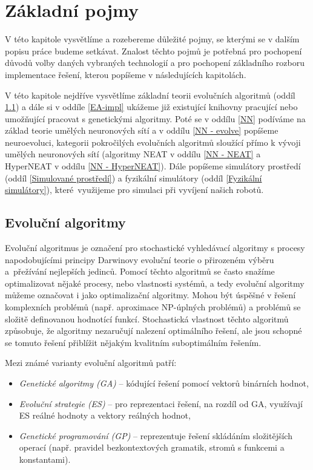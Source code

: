 \chapter{Základní pojmy} \label{chapter-zakladní pojmy}

V této kapitole vysvětlíme a rozebereme důležité pojmy, se kterými se v dalším
popisu práce budeme setkávat. Znalost těchto pojmů je potřebná pro pochopení
důvodů volby daných vybraných technologií a pro pochopení základního rozboru
implementace řešení, kterou popíšeme v následujících kapitolách.

V této kapitole nejdříve vysvětlíme základní teorii evolučních algoritmů (oddíl
\ref{Evoluční algoritmy}) a dále si v oddíle \ref{EA-impl} ukážeme již
existující knihovny pracující nebo umožňující pracovat s genetickými algoritmy.
Poté se v oddílu \ref{NN} podíváme na základ teorie umělých neuronových sítí a
v oddílu \ref{NN - evolve} popíšeme neuroevoluci, kategorii pokročilých
evolučních algoritmů sloužící přímo k vývoji umělých neuronových sítí
(algoritmy NEAT v oddílu \ref{NN - NEAT} a HyperNEAT v oddílu \ref{NN -
HyperNEAT}). Dále popíšeme simulátory prostředí (oddíl \ref{Simulované
prostředí}) a fyzikální simulátory (oddíl \ref{Fyzikální simulátory}),
které~využijeme pro simulaci při vyvíjení našich robotů.

\section{Evoluční algoritmy} \label{Evoluční algoritmy}

Evoluční algoritmus je označení pro stochastické vyhledávací algoritmy s
procesy napodobujícími principy Darwinovy evoluční teorie o přirozeném výběru
a~přežívání nejlepších jedinců. Pomocí těchto algoritmů se často snažíme
optimalizovat nějaké procesy, nebo vlastnosti systémů, a tedy evoluční
algoritmy můžeme označovat i jako optimalizační algoritmy. Mohou být úspěšné v
řešení komplexních problémů (např. aproximace NP-úplných problémů) a problémů
se složitě definovanou hodnotící funkcí. Stochastická vlastnost těchto
algoritmů způsobuje, že algoritmy nezaručují nalezení optimálního řešení, ale
jsou schopné se tomuto řešení přiblížit nějakým kvalitním suboptimálním
řešením.

Mezi známé varianty evoluční algoritmů patří:
\begin{itemize}
    \item \emph{Genetické algoritmy (GA)} -- kódující řešení pomocí vektorů binárních
        hodnot,
    \item \emph{Evoluční strategie (ES)} -- pro reprezentaci řešení, na rozdíl
        od GA, využívají ES reálné hodnoty a vektory reálných hodnot, 
    \item \emph{Genetické programování (GP)} -- reprezentuje řešení skládáním
        složitějších operací (např. pravidel bezkontextových gramatik, stromů s
        funkcemi a konstantami).
\end{itemize}

